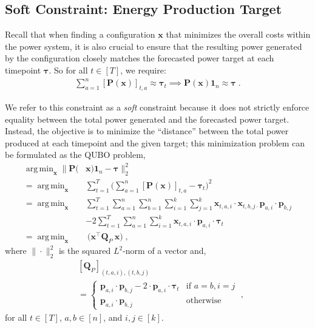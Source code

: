 \documentclass[conference]{IEEEtran}
\makeatletter
\newcommand{\bp}{\boldsymbol{p}}
\newcommand{\bP}{\boldsymbol{P}}
\newcommand{\bQ}{\boldsymbol{Q}}
\newcommand{\btau}{\boldsymbol{\tau}}
\newcommand{\ones}[1]{\boldsymbol{1}_{#1}}
\newcommand{\trans}{\intercal}
\newcommand{\indices}[1]{[#1]}
\newcommand{\bx}{\boldsymbol{x}}
\newcommand{\g}[1]{#1}
\DeclareMathOperator*{\argmin}{arg\,min}
\newcommand{\QUBO}{\textsc{QUBO}\@\xspace}
\makeatother
\begin{document}
\subsection{Soft Constraint: Energy Production Target}
Recall that when finding a configuration $\bx$ that minimizes the
overall costs within the power system, it is also crucial to ensure that
the resulting power generated by the configuration closely matches the
forecasted power target at each timepoint $\btau$. So for all
$t\in\indices{T}$,  we require:
\begin{align}
  \label{eq:constraint-power-bin}
  \sum_{a=1}^{n}[\g{\bP}(\bx)]_{t,a} \approx \btau_{t}
  \implies
  \bP(\bx)\ones{n} \approx \btau\;.
\end{align}

We refer to this constraint as a \textit{soft} constraint because it
does not strictly enforce equality between the total power generated and
the forecasted power target. Instead, the objective is to minimize the
``distance'' between the total power produced at each timepoint and the
given target; this minimization problem can be formulated as the {\QUBO}
problem,
\begin{align}
  \argmin_{\bx}\|
  \bP(&\bx)\ones{n}- \btau\|_{2}^{2}\nonumber\\
    =\argmin_{\bx}&\sum_{t=1}^{T} \Biggl(
    \sum_{a=1}^{n}[\bP(\bx)]_{t,a} - \btau_{t}\Biggr)^{2}
    \nonumber\\
  =\argmin_{\bx}
  &\sum_{t=1}^{T}
    \sum_{a=1}^{n}\sum_{b=1}^{n} \sum_{i=1}^{k}\sum_{j=1}^{k}
    \bx_{t,a,i}\cdot\bx_{t,b,j\cdot}\bp_{a,i}\cdot\bp_{b,j}
    \nonumber\\
  &-2\sum_{t=1}^{T}\sum_{a=1}^{n}\sum_{i=1}^{k}
    \bx_{t,a,i}\cdot\bp_{a,i}\cdot\btau_{t}
    \nonumber\\
  =\argmin_{\bx} &\:\bigl(\bx^{\trans} \bQ_{P}\: \bx\bigr)\;,
                \label{eq:power-qubo-eq}
\end{align}
where $\|\cdot\|_{2}^{2}$ is the squared $L^{2}$-norm of a vector and,
\begin{equation}
  \label{eq:power-qubo-mat}
  \begin{aligned}
    &[\bQ_{P}]_{(t,a,i),(t,b,j)}\\
    &=
      \begin{cases}
        \bp_{a,i} \cdot \bp_{b,j} -2 \cdot \bp_{a,i} \cdot \btau_{t}
        & \text{if } a=b, i=j\\
        \bp_{a,i} \cdot \bp_{b,j} &\text{otherwise}
      \end{cases}\;,
  \end{aligned}
\end{equation}
for all $t\in\indices{T}$, $a,b\in\indices{n}$, and $i,j\in\indices{k}$.
\end{document}
